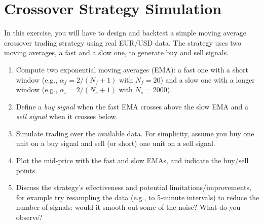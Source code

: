 \section{Crossover Strategy Simulation}
In this exercise, you will have to design and backtest a simple moving average crossover trading strategy using real EUR/USD data. The strategy uses two moving averages, a fast and a slow one, to generate buy and sell signals.
\begin{enumerate}
    \item Compute two exponential moving averages (EMA): a fast one with a short window (e.g., $\alpha_f=2/(N_f+1)$ with $N_f=20$) and a slow one with a longer window (e.g., $\alpha_s=2/(N_s+1)$ with $N_s=2000$).
    \item Define a \emph{buy signal} when the fast EMA crosses above the slow EMA and a \emph{sell signal} when it crosses below.
    \item Simulate trading over the available data. For simplicity, assume you buy one unit on a buy signal and sell (or short) one unit on a sell signal.
    \item Plot the mid-price with the fast and slow EMAs, and indicate the buy/sell points.
    \item Discuss the strategy's effectiveness and potential limitations/improvements, for example try resampling the data (e.g., to 5-minute intervals) to reduce the number of signals: would it smooth out some of the noise? What do you observe?
\end{enumerate}